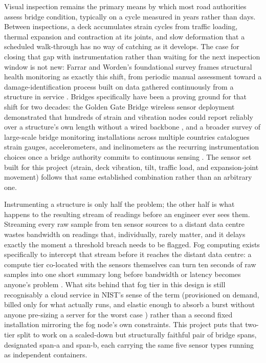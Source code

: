 \documentclass[conference]{IEEEtran}
\begin{document}
Visual inspection remains the primary means by which most road authorities assess bridge condition, typically on a cycle measured in years rather than days. Between inspections, a deck accumulates strain cycles from traffic loading, thermal expansion and contraction at its joints, and slow deformation that a scheduled walk-through has no way of catching as it develops. The case for closing that gap with instrumentation rather than waiting for the next inspection window is not new: Farrar and Worden's foundational survey frames structural health monitoring as exactly this shift, from periodic manual assessment toward a damage-identification process built on data gathered continuously from a structure in service \cite{ref1}. Bridges specifically have been a proving ground for that shift for two decades: the Golden Gate Bridge wireless sensor deployment demonstrated that hundreds of strain and vibration nodes could report reliably over a structure's own length without a wired backbone \cite{ref2}, and a broader survey of large-scale bridge monitoring installations across multiple countries catalogues strain gauges, accelerometers, and inclinometers as the recurring instrumentation choices once a bridge authority commits to continuous sensing \cite{ref3}. The sensor set built for this project (strain, deck vibration, tilt, traffic load, and expansion-joint movement) follows that same established combination rather than an arbitrary one.

Instrumenting a structure is only half the problem; the other half is what happens to the resulting stream of readings before an engineer ever sees them. Streaming every raw sample from ten sensor sources to a distant data centre wastes bandwidth on readings that, individually, rarely matter, and it delays exactly the moment a threshold breach needs to be flagged. Fog computing exists specifically to intercept that stream before it reaches the distant data centre: a compute tier co-located with the sensors themselves can turn ten seconds of raw samples into one short summary long before bandwidth or latency becomes anyone's problem \cite{ref5}. What sits behind that fog tier in this design is still recognisably a cloud service in NIST's sense of the term (provisioned on demand, billed only for what actually runs, and elastic enough to absorb a burst without anyone pre-sizing a server for the worst case \cite{ref4}) rather than a second fixed installation mirroring the fog node's own constraints. This project puts that two-tier split to work on a scaled-down but structurally faithful pair of bridge spans, designated span-a and span-b, each carrying the same five sensor types running as independent containers.
\end{document}
